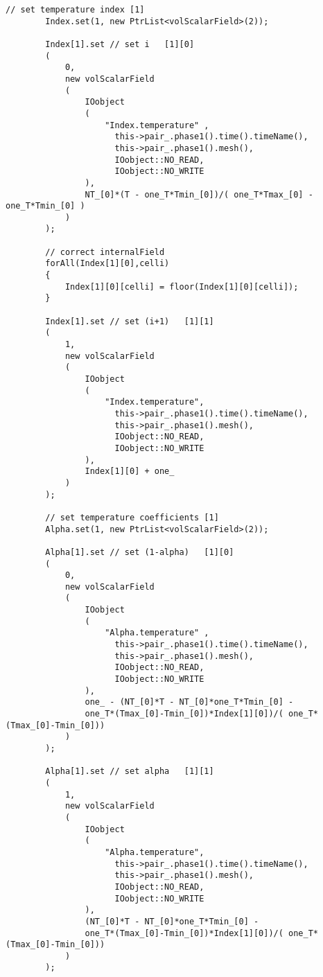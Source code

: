 \documentclass[a4paper, 12 pt, fleqn]{article}
\begin{document}
\begin{lstlisting}[gobble=7]
        // set temperature index [1]
        Index.set(1, new PtrList<volScalarField>(2));

        Index[1].set // set i   [1][0]
        (
            0,
            new volScalarField
            (
                IOobject
                (
                    "Index.temperature" ,
	                  this->pair_.phase1().time().timeName(),
	                  this->pair_.phase1().mesh(),
	                  IOobject::NO_READ,
	                  IOobject::NO_WRITE
                ),
                NT_[0]*(T - one_T*Tmin_[0])/( one_T*Tmax_[0] - one_T*Tmin_[0] )
            )
        );

        // correct internalField
        forAll(Index[1][0],celli)
        {
            Index[1][0][celli] = floor(Index[1][0][celli]);
        }  

        Index[1].set // set (i+1)   [1][1]
        (
            1,
            new volScalarField
            (
                IOobject
                (
                    "Index.temperature",
	                  this->pair_.phase1().time().timeName(),
	                  this->pair_.phase1().mesh(),
	                  IOobject::NO_READ,
	                  IOobject::NO_WRITE
                ),
                Index[1][0] + one_
            )
        );

        // set temperature coefficients [1]
        Alpha.set(1, new PtrList<volScalarField>(2));

        Alpha[1].set // set (1-alpha)   [1][0]
        (
            0,
            new volScalarField
            (
                IOobject
                (
                    "Alpha.temperature" ,
	                  this->pair_.phase1().time().timeName(),
	                  this->pair_.phase1().mesh(),
	                  IOobject::NO_READ,
	                  IOobject::NO_WRITE
                ),
                one_ - (NT_[0]*T - NT_[0]*one_T*Tmin_[0] - 
                one_T*(Tmax_[0]-Tmin_[0])*Index[1][0])/( one_T*(Tmax_[0]-Tmin_[0])) 
            )
        );

        Alpha[1].set // set alpha   [1][1]
        (
            1,
            new volScalarField
            (
                IOobject
                (
                    "Alpha.temperature",
	                  this->pair_.phase1().time().timeName(),
	                  this->pair_.phase1().mesh(),
	                  IOobject::NO_READ,
	                  IOobject::NO_WRITE
                ),
                (NT_[0]*T - NT_[0]*one_T*Tmin_[0] - 
                one_T*(Tmax_[0]-Tmin_[0])*Index[1][0])/( one_T*(Tmax_[0]-Tmin_[0])) 
            )
        );


\end{lstlisting}
\end{document}
